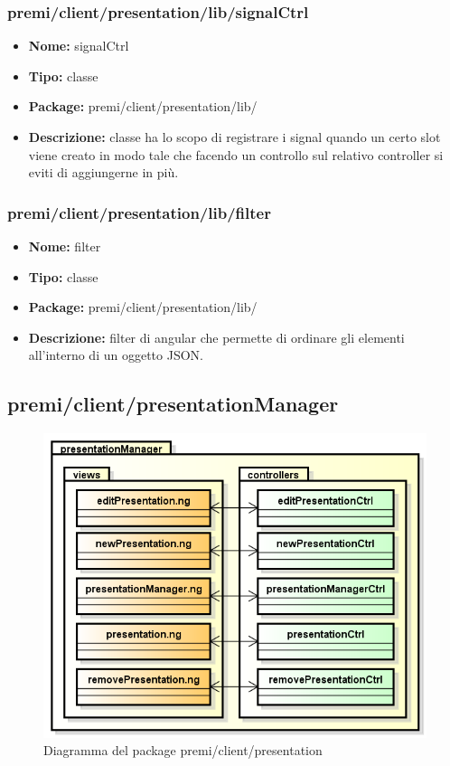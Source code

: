 \subsubsection{premi/client/presentation/lib/signalCtrl}
\begin{itemize}
  \item[] \textbf{Nome:} signalCtrl
  \item[] \textbf{Tipo:} classe
  \item[] \textbf{Package:} premi/client/presentation/lib/
  \item[] \textbf{Descrizione:} classe ha lo scopo di registrare i signal quando un certo slot viene creato in modo tale che facendo un controllo sul relativo controller si eviti di aggiungerne in più.
\end{itemize}

\subsubsection{premi/client/presentation/lib/filter}
\begin{itemize}
  \item[] \textbf{Nome:} filter
  \item[] \textbf{Tipo:} classe
  \item[] \textbf{Package:} premi/client/presentation/lib/
  \item[] \textbf{Descrizione:} filter di angular che permette di ordinare gli elementi all'interno di un oggetto JSON. 
\end{itemize}



\subsection{premi/client/presentationManager}
\begin{figure}[!h]
\begin{center}
\includegraphics[scale=0.45]{img/diapkg/presentationManager.png}
\caption{Diagramma del package premi/client/presentation}
\end{center}
\end{figure}



